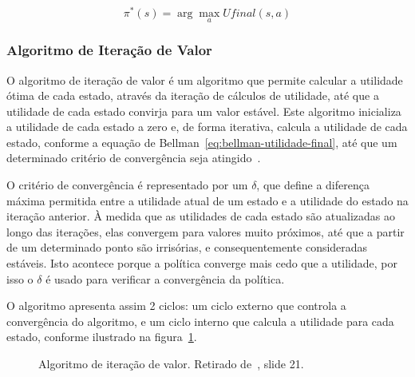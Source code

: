 \begin{equation}
    \label{eq:bellman-politica-otima}
    \pi^*(s) = \arg\max_{a} Ufinal(s, a)
\end{equation}

\subsubsection{Algoritmo de Iteração de Valor}\label{subsubsec:algoritmo-iteracao-valor}

O algoritmo de iteração de valor é um algoritmo que permite calcular a utilidade ótima de cada estado, através da iteração de cálculos de utilidade, até que a utilidade de cada estado convirja para um valor estável.
Este algoritmo inicializa a utilidade de cada estado a zero e, de forma iterativa, calcula a utilidade de cada estado, conforme a equação de Bellman~\ref{eq:bellman-utilidade-final}, até que um determinado critério de convergência seja atingido~\cite{isel:iasa:slides:processos-decisao-sequencial}.

O critério de convergência é representado por um $\delta$, que define a diferença máxima permitida entre a utilidade atual de um estado e a utilidade do estado na iteração anterior.
À medida que as utilidades de cada estado são atualizadas ao longo das iterações, elas convergem para valores muito próximos, até que a partir de um determinado ponto são irrisórias, e consequentemente consideradas estáveis.
Isto acontece porque a política converge mais cedo que a utilidade, por isso o $\delta$ é usado para verificar a convergência da política.

O algoritmo apresenta assim 2 ciclos: um ciclo externo que controla a convergência do algoritmo, e um ciclo interno que calcula a utilidade para cada estado, conforme ilustrado na figura~\ref{fig:algoritmo-iteracao-valor}.

\begin{figure}[H]
    \begin{center}
    \end{center}
    \caption{Algoritmo de iteração de valor.
    Retirado de~\cite{isel:iasa:slides:processos-decisao-sequencial}, slide 21.}
    \label{fig:algoritmo-iteracao-valor}
\end{figure}

